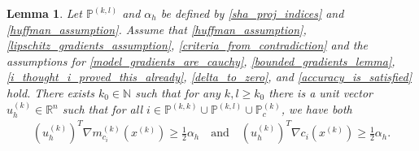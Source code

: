 \documentclass{article}
\newtheorem{lemma}[theorem]{Lemma}
\theoremstyle{case}
\numberwithin{theorem}{subsection}
\newcommand{\gmcik}{{\nabla m_{c_i}^{(k)}\left(\xk\right)}}
\newcommand{\gmcil}{{\nabla m_{c_i}^{(l)}\left(\xl\right)}}
\newcommand{\naturals}{\mathbb N}
\newcommand{\Rn}{\mathbb R^n}
\newcommand{\xk}{x^{(k)}}
\newcommand{\xl}{{x^{(l)}}}
\newcommand{\trueactiveprojk}{{\mathbb P_c^{(k)}}}
\newcommand{\activeprojkk}{{\mathbb P^{(k, k)}}}
\newcommand{\activeprojkl}{{\mathbb P^{(k, l)}}}
\newcommand{\huffalpha}{{\alpha_h}}
\newcommand{\huffdirk}{{u^{(k)}_h}}
\begin{document}
\begin{lemma}
\label{bp_combining_several}
Let $\activeprojkl$ and $\huffalpha$ be defined by \cref{sha_proj_indices} and \cref{huffman_assumption}.
Assume that \cref{huffman_assumption}, \cref{lipschitz_gradients_assumption}, \cref{criteria_from_contradiction} and the assumptions for
\cref{model_gradients_are_cauchy}, \cref{bounded_gradients_lemma}, \cref{i_thought_i_proved_this_already}, \cref{delta_to_zero}, and \cref{accuracy_is_satisfied} hold.
There exists $k_0 \in \naturals$ such that for any $k, l \ge k_0$ 
there is a unit vector $ \huffdirk \in \Rn $ such that for all $i \in \activeprojkk \cup \activeprojkl \cup \trueactiveprojk$, we have both
\begin{align*}
\left(\huffdirk\right)^T \gmcik \ge \frac 1 2 \huffalpha
\quad \textrm{and} \quad
\left(\huffdirk\right)^T\nabla c_i\left(\xk\right)\ge \frac 1 2 \huffalpha.
\end{align*}
\end{lemma}
\end{document}
